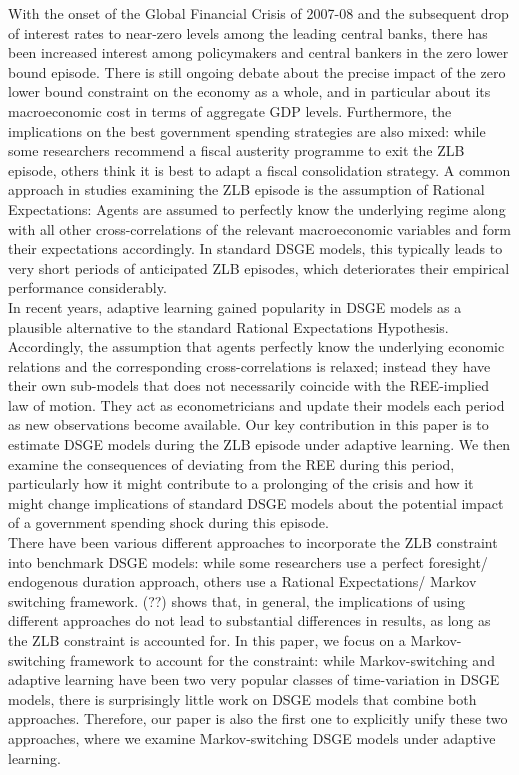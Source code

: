 \documentclass[12pt,reqno]{article}
\numberwithin{equation}{section}
\begin{document}
With the onset of the Global Financial Crisis of 2007-08 and the subsequent drop of interest rates to near-zero levels among the leading central banks, there has been increased interest among policymakers and central bankers in the zero lower bound episode. There is still ongoing debate about the precise impact of the zero lower bound constraint on the economy as a whole, and in particular about its macroeconomic cost in terms of aggregate GDP levels. Furthermore, the implications on the best government spending strategies are also mixed: while some researchers recommend a fiscal austerity programme to exit the ZLB episode, others think it is best to adapt a fiscal consolidation strategy. A common approach in studies examining the ZLB episode is the assumption of Rational Expectations: Agents are assumed to perfectly know the underlying regime along with all other cross-correlations of the relevant macroeconomic variables and form their expectations accordingly. In standard DSGE models, this typically leads to very short periods of anticipated ZLB episodes, which deteriorates their empirical performance considerably. \\

In recent years, adaptive learning gained popularity in DSGE models as a plausible alternative to the standard Rational Expectations Hypothesis. Accordingly, the assumption that agents perfectly know the underlying economic relations and the corresponding cross-correlations is relaxed; instead they have their own sub-models that does not necessarily coincide with the REE-implied law of motion. They act as econometricians and update their models each period as new observations become available. Our key contribution in this paper is to estimate DSGE models during the ZLB episode under adaptive learning. We then examine the consequences of deviating from the REE during this period, particularly how it might contribute to a prolonging of the crisis and how it might change implications of standard DSGE models about the potential impact of a government spending shock during this episode. \\

There have been various different approaches to incorporate the ZLB constraint into benchmark DSGE models: while some researchers use a perfect foresight/ endogenous duration approach, others use a Rational Expectations/ Markov switching framework. (??) shows that, in general, the implications of using different approaches do not lead to substantial differences in results, as long as the ZLB constraint is accounted for. In this paper, we focus on a Markov-switching framework to account for the constraint: while Markov-switching and adaptive learning have been two very popular classes of time-variation in DSGE models, there is surprisingly little work on DSGE models that combine both approaches. Therefore, our paper is also the first one to explicitly unify these two approaches, where we examine Markov-switching DSGE models under adaptive learning. \\
\end{document}
